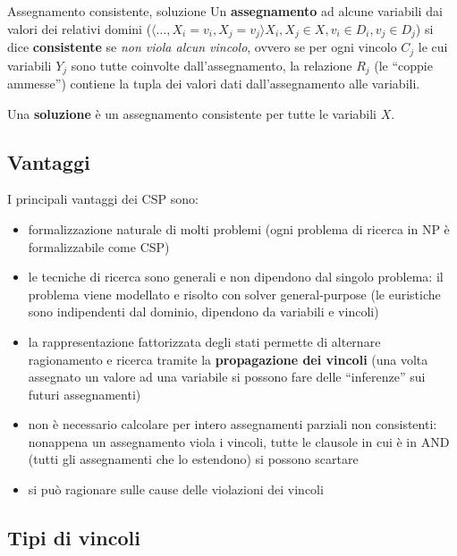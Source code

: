 \documentclass[a4paper,11pt]{report}
\begin{document}
\begin{defframe}{Assegnamento consistente, soluzione}{}
    Un \textbf{assegnamento} ad alcune variabili dai valori dei relativi domini ($\langle \dots, X_i = v_i, X_j = v_j \rangle X_i, X_j \in X, v_i \in D_i, v_j \in D_j$) si dice \textbf{consistente} se \textit{non viola alcun vincolo}, ovvero se per ogni vincolo $C_j$ le cui variabili $Y_j$ sono tutte coinvolte dall'assegnamento, la relazione $R_j$ (le ``coppie ammesse'') contiene la tupla dei valori dati dall'assegnamento alle variabili.

    Una \textbf{soluzione} è un assegnamento consistente per tutte le variabili $X$.
\end{defframe}

\subsection{Vantaggi}
I principali vantaggi dei CSP sono:
\begin{itemize}
    \item formalizzazione naturale di molti problemi (ogni problema di ricerca in NP è formalizzabile come CSP)
    \item le tecniche di ricerca sono generali e non dipendono dal singolo problema: il problema viene modellato e risolto con solver general-purpose (le euristiche sono indipendenti dal dominio, dipendono da variabili e vincoli)
    \item la rappresentazione fattorizzata degli stati permette di alternare ragionamento e ricerca tramite la \textbf{propagazione dei vincoli} (una volta assegnato un valore ad una variabile si possono fare delle ``inferenze'' sui futuri assegnamenti)
    \item non è necessario calcolare per intero assegnamenti parziali non consistenti: nonappena un assegnamento viola i vincoli, tutte le clausole in cui è in AND (tutti gli assegnamenti che lo estendono) si possono scartare
    \item si può ragionare sulle cause delle violazioni dei vincoli
\end{itemize}

\subsection{Tipi di vincoli}
\end{document}
